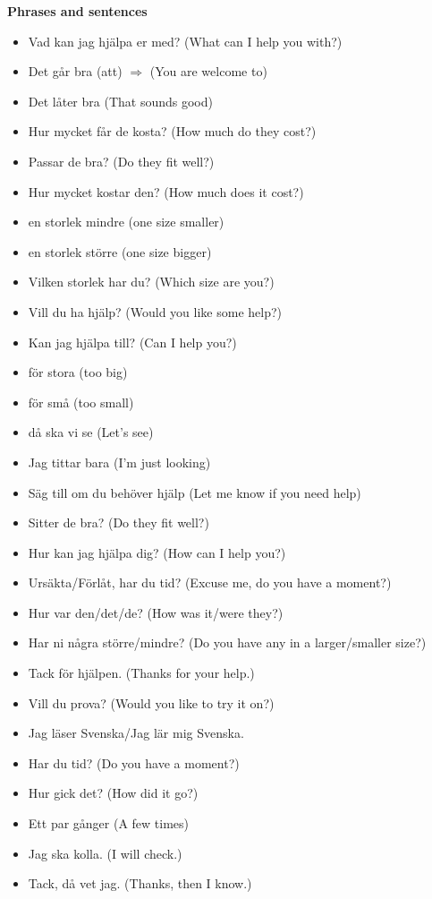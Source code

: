
\begin{flushleft}
    \textbf{Phrases and sentences}
    \begin{itemize}
        \item Vad kan jag hjälpa er med? (What can I help you with?)
        \item Det går bra (att) $\Rightarrow$ (You are welcome to)
        \item Det låter bra (That sounds good)
        \item Hur mycket får de kosta? (How much do they cost?)
        \item Passar de bra? (Do they fit well?)
        \item Hur mycket kostar den? (How much does it cost?)
        \item en storlek mindre (one size smaller)
        \item en storlek större (one size bigger)
        \item Vilken storlek har du? (Which size are you?)
        \item Vill du ha hjälp? (Would you like some help?)
        \item Kan jag hjälpa till? (Can I help you?)
        \item för stora (too big)
        \item för små (too small)
        \item då ska vi se (Let's see)
        \item Jag tittar bara (I'm just looking)
        \item Säg till om du behöver hjälp (Let me know if you need help)
        \item Sitter de bra? (Do they fit well?)
        \item Hur kan jag hjälpa dig? (How can I help you?)
        \item Ursäkta/Förlåt, har du tid? (Excuse me, do you have a moment?)
        \item Hur var den/det/de? (How was it/were they?)
        \item Har ni några större/mindre? (Do you have any in a larger/smaller size?)
        \item Tack för hjälpen. (Thanks for your help.)
        \item Vill du prova? (Would you like to try it on?)
        \item Jag läser Svenska/Jag lär mig Svenska.
        \item Har du tid? (Do you have a moment?)
        \item Hur gick det? (How did it go?)
        \item Ett par gånger (A few times)
        \item Jag ska kolla. (I will check.)
        \item Tack, då vet jag. (Thanks, then I know.)
    \end{itemize}
\end{flushleft}

